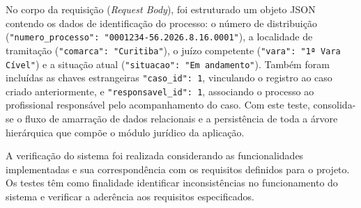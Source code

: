 No corpo da requisição (\textit{Request Body}), foi estruturado um objeto JSON
contendo os dados de identificação do processo: o número de distribuição
(\texttt{"numero\_processo": "0001234-56.2026.8.16.0001"}), a localidade de
tramitação (\texttt{"comarca": "Curitiba"}), o juízo competente
(\texttt{"vara": "1ª Vara Cível"}) e a situação atual
(\texttt{"situacao": "Em andamento"}). Também foram incluídas as chaves estrangeiras
\texttt{"caso\_id": 1}, vinculando o registro ao caso criado anteriormente, e
\texttt{"responsavel\_id": 1}, associando o processo ao profissional responsável
pelo acompanhamento do caso.
Com este teste, consolida-se o fluxo de amarração de dados relacionais e a persistência de toda a árvore 
hierárquica que compõe o módulo jurídico da aplicação.

A verificação do sistema foi realizada considerando as funcionalidades implementadas e sua correspondência com os requisitos definidos para o projeto. Os testes têm como finalidade identificar inconsistências no funcionamento do sistema e verificar a aderência aos requisitos especificados.

